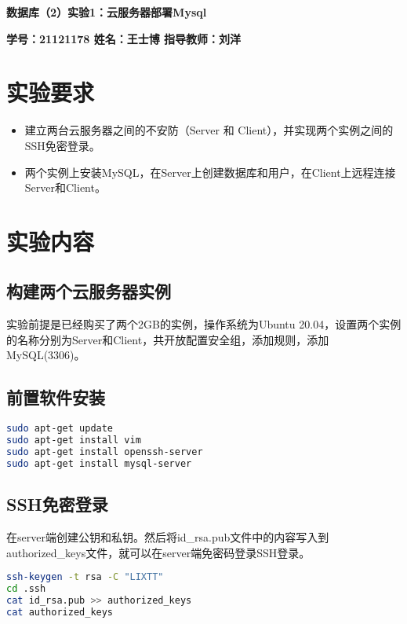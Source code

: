 \documentclass{IEEEconf}
\begin{document}
 \pingfang
\begin{center}
    \textbf{\huge 数据库（2）实验1：云服务器部署Mysql}
\end{center}
\begin{center}
    \textbf{\large \textbf{学号：21121178 \quad 姓名：王士博 \quad 指导教师：刘洋}}
\end{center}
\hrulefill

\section{实验要求}

\begin{itemize}
  \item 建立两台云服务器之间的不安防（Server 和 Client），并实现两个实例之间的SSH免密登录。
  \item 两个实例上安装MySQL，在Server上创建数据库和用户，在Client上远程连接Server和Client。
\end{itemize}

\section{实验内容}

\subsection{构建两个云服务器实例}

实验前提是已经购买了两个2GB的实例，操作系统为Ubuntu 20.04，设置两个实例的名称分别为Server和Client，共开放配置安全组，添加规则，添加MySQL(3306)。

\subsection{前置软件安装}

\begin{lstlisting}[language=bash]
sudo apt-get update
sudo apt-get install vim
sudo apt-get install openssh-server
sudo apt-get install mysql-server
\end{lstlisting}

\subsection{SSH免密登录}

在server端创建公钥和私钥。然后将id\_rsa.pub文件中的内容写入到authorized\_keys文件，就可以在server端免密码登录SSH登录。

\begin{lstlisting}[language=bash]
ssh-keygen -t rsa -C "LIXTT"
cd .ssh
cat id_rsa.pub >> authorized_keys
cat authorized_keys
\end{lstlisting}
\end{document}
